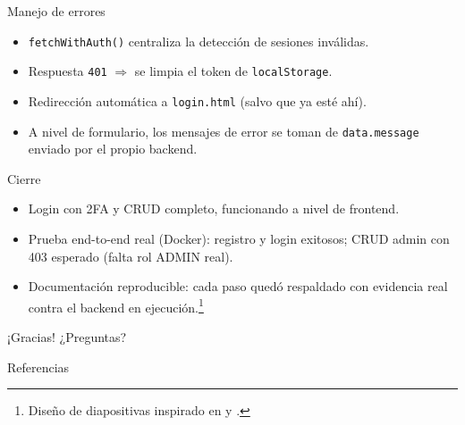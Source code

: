 \documentclass{beamer}
\begin{document}
\begin{frame}{Manejo de errores}
    \vfill
    \begin{itemize}
        \item \texttt{fetchWithAuth()} centraliza la detección de sesiones inválidas.
        \item Respuesta \texttt{401} \(\Rightarrow\) se limpia el token de \texttt{localStorage}.
        \item Redirección automática a \texttt{login.html} (salvo que ya esté ahí).
        \item A nivel de formulario, los mensajes de error se toman de \texttt{data.message} enviado por el propio backend.
    \end{itemize}
    \vfill
\end{frame}

\begin{frame}{Cierre}
    \begin{itemize}
        \item Login con 2FA y CRUD completo, funcionando a nivel de frontend.
        \item Prueba end-to-end real (Docker): registro y login exitosos; CRUD admin con 403 esperado (falta rol ADMIN real).
        \item Documentación reproducible: cada paso quedó respaldado con evidencia real contra el backend en ejecución.\footnote{\scriptsize Diseño de diapositivas inspirado en \cite{alley2013} y \cite{mayer2009}.}
    \end{itemize}
    \vspace{10pt}
    \begin{center}
        \Large ¡Gracias! ¿Preguntas?
    \end{center}
\end{frame}

\begin{frame}[allowframebreaks]{Referencias}
    \footnotesize
    
    
\end{frame}
\end{document}
